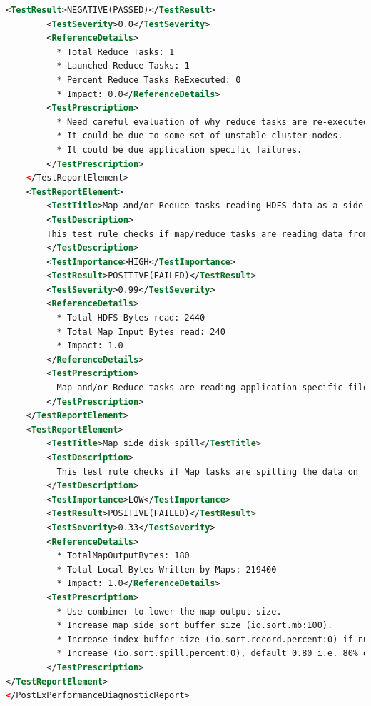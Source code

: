 \begin{lstlisting}[language=XML]
        <TestResult>NEGATIVE(PASSED)</TestResult>
        <TestSeverity>0.0</TestSeverity>
        <ReferenceDetails>
          * Total Reduce Tasks: 1
          * Launched Reduce Tasks: 1
          * Percent Reduce Tasks ReExecuted: 0
          * Impact: 0.0</ReferenceDetails>
        <TestPrescription>
          * Need careful evaluation of why reduce tasks are re-executed.
          * It could be due to some set of unstable cluster nodes.
          * It could be due application specific failures.
        </TestPrescription>
    </TestReportElement>
    <TestReportElement>
        <TestTitle>Map and/or Reduce tasks reading HDFS data as a side effect</TestTitle>
        <TestDescription>
        This test rule checks if map/reduce tasks are reading data from HDFS as a side effect. More the data read as a side effect can potentially be a bottleneck across parallel execution of map/reduce tasks.
        </TestDescription>
        <TestImportance>HIGH</TestImportance>
        <TestResult>POSITIVE(FAILED)</TestResult>
        <TestSeverity>0.99</TestSeverity>
        <ReferenceDetails>
          * Total HDFS Bytes read: 2440
          * Total Map Input Bytes read: 240
          * Impact: 1.0
        </ReferenceDetails>
        <TestPrescription>
          Map and/or Reduce tasks are reading application specific files from HDFS. Make sure the replication factor of these HDFS files is high enough to avoid the data reading bottleneck. Typically replication factor can be square root of map/reduce tasks capacity of the allocated cluster.
        </TestPrescription>
    </TestReportElement>
    <TestReportElement>
        <TestTitle>Map side disk spill</TestTitle>
        <TestDescription>
          This test rule checks if Map tasks are spilling the data on to the local disk during the map side sorting due to insufficient sort buffer size. The impact is calculated as ratio between local bytes written to map output bytes. Impact is normalized using NormalizationFactor given below and any value greater than or equal to normalization factor is treated as maximum (i.e. 1).
        </TestDescription>
        <TestImportance>LOW</TestImportance>
        <TestResult>POSITIVE(FAILED)</TestResult>
        <TestSeverity>0.33</TestSeverity>
        <ReferenceDetails>
          * TotalMapOutputBytes: 180
          * Total Local Bytes Written by Maps: 219400
          * Impact: 1.0</ReferenceDetails>
        <TestPrescription>
          * Use combiner to lower the map output size.
          * Increase map side sort buffer size (io.sort.mb:100).
          * Increase index buffer size (io.sort.record.percent:0) if number of Map Output Records are large.
          * Increase (io.sort.spill.percent:0), default 0.80 i.e. 80% of sort buffer size and index buffer size.
        </TestPrescription>
</TestReportElement>
</PostExPerformanceDiagnosticReport>
\end{lstlisting}
